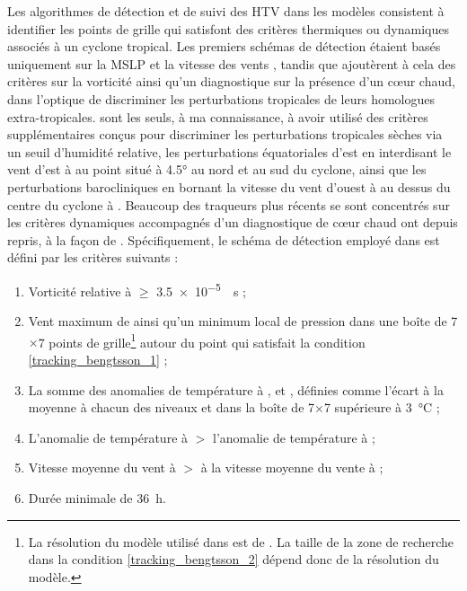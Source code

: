 \documentclass[../main.tex]{subfiles}
\begin{document}
Les algorithmes de détection et de suivi des HTV dans les modèles consistent à identifier les points de grille qui satisfont des critères thermiques ou
dynamiques associés à un cyclone tropical. Les premiers schémas de détection étaient basés uniquement sur la MSLP et la vitesse des vents
\parencite{bengtsson_simulation_1982,broccoli_can_1990}, tandis que \cite{haarsma_tropical_1993,bengtsson_hurricanetype_1995} ajoutèrent à cela des critères sur
la vorticité ainsi qu'un diagnostique sur la présence d'un cœur chaud, dans l'optique de discriminer les perturbations tropicales de leurs homologues
extra-tropicales. \cite{wu_gcm_1992} sont les seuls, à ma connaissance, à avoir utilisé des critères supplémentaires conçus pour discriminer les perturbations
tropicales sèches via un seuil d'humidité relative, les perturbations équatoriales d'est en interdisant le vent d'est à  au point situé à \ang{4.5} au
nord et au sud du cyclone, ainsi que les perturbations barocliniques en bornant la vitesse du vent d'ouest à  au dessus du centre du cyclone à
. Beaucoup des traqueurs plus récents se sont concentrés sur les critères dynamiques accompagnés d'un diagnostique de cœur chaud ont depuis repris, à la
façon de \cite{haarsma_tropical_1993,bengtsson_hurricanetype_1995}. Spécifiquement, le schéma de détection employé dans \cite{bengtsson_hurricanetype_1995} est
défini par les critères suivants :
%
\begin{enumerate}
    \item\label{tracking_bengtsson_1} Vorticité relative à  $\ge$ \SI{3.5e-5}{\per\second} ;
    \item\label{tracking_bengtsson_2} Vent maximum de  ainsi qu'un minimum local de pression dans une boîte de \num{7}$\times$\num{7} points de
        grille\footnote{La résolution du modèle utilisé dans \cite{bengtsson_hurricanetype_1995} est de . La taille de la zone de recherche dans
        la condition \ref{tracking_bengtsson_2} dépend donc de la résolution du modèle.} autour du point qui satisfait la condition \ref{tracking_bengtsson_1} ;
    \item\label{tracking_bengtsson_3} La somme des anomalies de température à ,  et , définies comme l'écart à la moyenne à chacun
        des niveaux et dans la boîte de \num{7}$\times$\num{7} supérieure à \SI{3}{\degreeCelsius} ;
    \item\label{tracking_bengtsson_4} L'anomalie de température à  $>$ l'anomalie de température à  ;
    \item\label{tracking_bengtsson_5} Vitesse moyenne du vent à  $>$ à la vitesse moyenne du vente à  ;
    \item\label{tracking_bengtsson_6} Durée minimale de \SI{36}{\hour}.
\end{enumerate}
\end{document}
